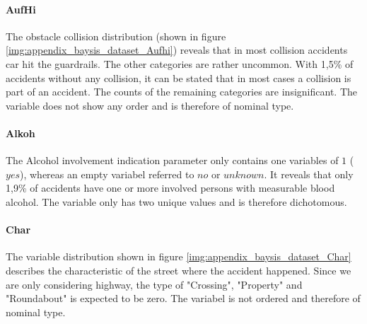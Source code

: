 \documentclass[a4paper,headsepline,footsepline,fontsize=11pt,BCOR=12mm,DIV=12]{report}
\begin{document}
\paragraph{AufHi}
The obstacle collision distribution (shown in figure \ref{img:appendix_baysis_dataset_Aufhi}) reveals that in most collision accidents car hit the guardrails. The other categories are rather uncommon. With 1,5\% of accidents without any collision, it can be stated that in most cases a collision is part of an accident. The counts of the remaining categories are insignificant. The variable does not show any order and is therefore of nominal type.


\paragraph{Alkoh}
The Alcohol involvement indication parameter only contains one variables of $1$ ($yes$), whereas an empty variabel referred to $no$ or $unknown$. It reveals that only 1,9\% of accidents have one or more involved persons with measurable blood alcohol. The variable only has two unique values and is therefore dichotomous.

\paragraph{Char}
The variable distribution shown in figure \ref{img:appendix_baysis_dataset_Char} describes the characteristic of the street where the accident happened. Since we are only considering highway, the type of "Crossing", "Property" and "Roundabout" is expected to be zero. The variabel is not ordered and therefore of nominal type.
\end{document}
